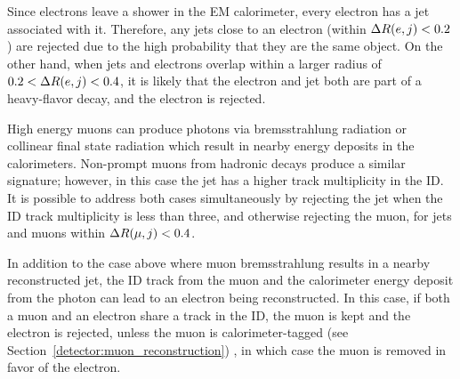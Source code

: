 Since electrons leave a shower in the EM calorimeter, every electron has a jet associated with it.
Therefore, any jets close to an electron (within $\Delta R(e,j) < 0.2$) are rejected due to the high probability that they are the same object.
On the other hand, when jets and electrons overlap within a larger radius of $0.2 < \Delta R(e,j) < 0.4$, it is likely that the electron and jet both are part of a heavy-flavor decay, and the electron is rejected.

High energy muons can produce photons via bremsstrahlung radiation or collinear final state radiation which result in nearby energy deposits in the calorimeters.
Non-prompt muons from hadronic decays produce a similar signature; however, in this case the jet has a higher track multiplicity in the ID.
It is possible to address both cases simultaneously by rejecting the jet when the ID track multiplicity is less than three, and otherwise rejecting the muon, for jets and muons within $\Delta R(\mu,j) < 0.4$.

In addition to the case above where muon bremsstrahlung results in a nearby reconstructed jet, the ID track from the muon and the calorimeter energy deposit from the photon can lead to an electron being reconstructed.
In this case, if both a muon and an electron share a track in the ID, the muon is kept and the electron is rejected, unless the muon is calorimeter-tagged (see Section~\ref{detector:muon_reconstruction})%
, in which case the muon is removed in favor of the electron.

